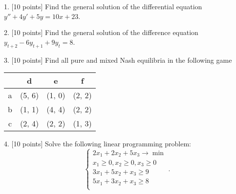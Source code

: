 \documentclass[12pt,a4paper]{article}
\begin{document}

 1.  {[10 points]} Find the general solution of the differential equation $y'' + 4y' + 5y = 10x+23$.

 
 \newpage
{}

  2.  {[10 points]}  Find the general solution of the difference equation $y_{t+2} - 6y_{t+1} + 9y_t = 8$.

\newpage
{}

  3. {[10 points]} Find all pure and mixed Nash equilibria in the following game

\begin{center}
\begin{tabular}{@{}cccc@{}}
\toprule
  & d & e & f \\ \midrule
a & (5, 6) & (1, 0)  & (2, 2)   \\
b & (1, 1) & (4, 4) & (2, 2)   \\
c & (2, 4) & (2, 2) & (1, 3)   \\ \bottomrule
\end{tabular}
\end{center}

\newpage
{}

4. {[10 points]} Solve the following linear programming problem:
\[
\begin{cases}
2x_1 + 2x_2 + 5x_3 \to \min \\
x_1 \geq 0, x_2 \geq 0, x_3 \geq 0 \\
3x_1 + 5x_2 + x_3 \geq 9 \\
5x_1 + 3x_2 + x_3 \geq 8 \\
\end{cases}.
\]
\end{document}
